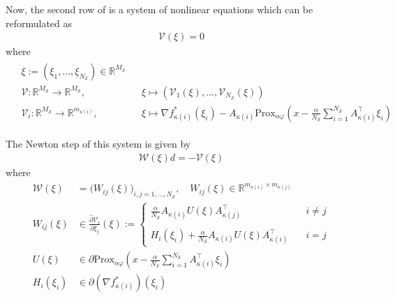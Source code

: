 \documentclass[12pt,a4paper,twoside]{article}
\makeatletter
\renewcommand*{\eqref}[1]{%
	\hyperref[{#1}]{\textup{\tagform@{\ref*{#1}}}}%
}
\theoremstyle{plain}
\theoremstyle{note}
\numberwithin{thm}{section}
\newcommand{\trp}[1]{#1^{\intercal}}
\newcommand{\prox}[2]{\text{Prox}_{#1}\left(#2\right)}
\newcommand{\ixmap}[1]{{\kappa(#1)}}
\let\temp\phi
\let\phi\varphi
\let\varphi\temp
\makeatother
\begin{document}
	Now, the second row of \eqref{eqn:nonlinear_system_stochastic} is a system of nonlinear equations which can be reformulated as
	\begin{align}
	\label{eqn:newton_equation}
		\mathcal{V}(\xi) = 0
	\end{align}
	where
	\begin{align}
	\label{eqn:definition_V}
	\begin{alignedat}{2}
		&\xi := \left(\xi_1, \dots, \xi_{N_{\mathcal{S}}}\right) \in \mathbb{R}^{M_{\mathcal{S}}}\\
		&\mathcal{V}: \mathbb{R}^{M_{\mathcal{S}}} \to \mathbb{R}^{M_{\mathcal{S}}}, \quad &&\xi \mapsto \left(\mathcal{V}_1(\xi), \dots, \mathcal{V}_{N_\mathcal{S}}(\xi)\right) \\
		&\mathcal{V}_i: \mathbb{R}^{M_{\mathcal{S}}} \to \mathbb{R}^{m_\ixmap{i}}, \quad &&\xi \mapsto \nabla f_\ixmap{i}^\ast(\xi_i) - A_\ixmap{i} \prox{\alpha \phi}{x - \frac{\alpha}{N_{\mathcal{S}}} \sum_{i=1}^{N_{\mathcal{S}}} A_\ixmap{i}^\intercal \xi_i}
	\end{alignedat}
	\end{align}
	
	The Newton step of this system is given by 
	\begin{align*}
		\mathcal{W}(\xi)d = - \mathcal{V}(\xi)
	\end{align*}
	where
	\begin{align}
	\label{eqn:newton_step}
	\begin{split}
		\mathcal{W}(\xi) &= \Big(W_{ij}(\xi) \Big)_{i,j = 1,\dots, N_\mathcal{S}}, \quad W_{ij}(\xi) \in \mathbb{R}^{m_\ixmap{i} \times m_\ixmap{j}} \\
		W_{ij}(\xi) &\in \frac{\hat{\partial} \mathcal{V}_i}{\partial \xi_j}(\xi) := 
		\begin{cases}
		\frac{\alpha}{N_{\mathcal{S}}} A_\ixmap{i} U(\xi) \trp{A}_\ixmap{j} &\quad i\neq j \\
		\\
		H_i(\xi_i) + \frac{\alpha}{N_{\mathcal{S}}} A_\ixmap{i} U(\xi) \trp{A}_\ixmap{i} &\quad i=j
		\end{cases}\\
		U(\xi) &\in \partial \prox{\alpha \phi}{x - \frac{\alpha}{N_\mathcal{S}} \sum_{i=1}^{N_{\mathcal{S}}} A_\ixmap{i}^\intercal \xi_i}\\
		H_i(\xi_i) &\in \partial\left(\nabla f_\ixmap{i}^\ast\right)(\xi_i)
	\end{split}
	\end{align}
	
\end{document}
